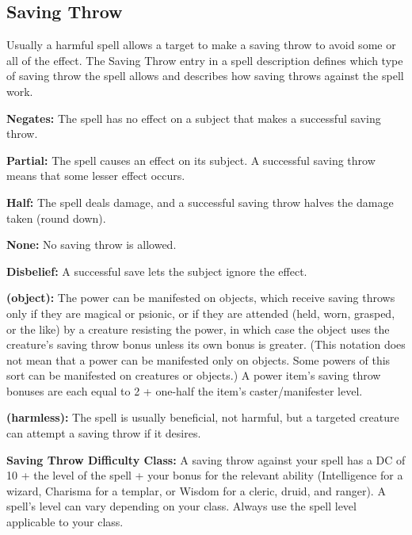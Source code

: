 \subsection{Saving Throw}
Usually a harmful spell allows a target to make a saving throw to avoid some or all of the effect. The Saving Throw entry in a spell description defines which type of saving throw the spell allows and describes how saving throws against the spell work.

\textbf{Negates:} The spell has no effect on a subject that makes a successful saving throw.

\textbf{Partial:} The spell causes an effect on its subject. A successful saving throw means that some lesser effect occurs.

\textbf{Half:} The spell deals damage, and a successful saving throw halves the damage taken (round down).

\textbf{None:} No saving throw is allowed.

\textbf{Disbelief:} A successful save lets the subject ignore the effect.

\textbf{(object):} The power can be manifested on objects, which receive saving throws only if they are magical or psionic, or if they are attended (held, worn, grasped, or the like) by a creature resisting the power, in which case the object uses the creature's saving throw bonus unless its own bonus is greater. (This notation does not mean that a power can be manifested only on objects. Some powers of this sort can be manifested on creatures or objects.) A power item's saving throw bonuses are each equal to 2 + one-half the item's caster/manifester level.

\textbf{(harmless):} The spell is usually beneficial, not harmful, but a targeted creature can attempt a saving throw if it desires.

\textbf{Saving Throw Difficulty Class:} A saving throw against your spell has a DC of 10 + the level of the spell + your bonus for the relevant ability (Intelligence for a wizard, Charisma for a templar, or Wisdom for a cleric, druid, and ranger). A spell's level can vary depending on your class. Always use the spell level applicable to your class.

